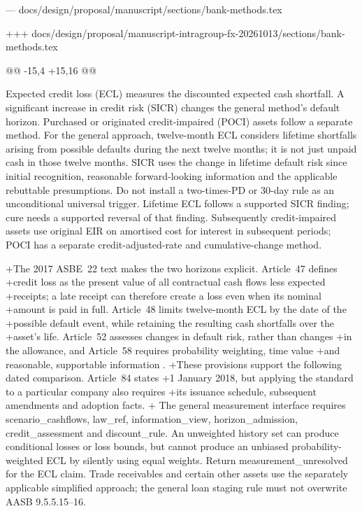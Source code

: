 --- docs/design/proposal/manuscript/sections/bank-methods.tex

+++ docs/design/proposal/manuscript-intragroup-fx-20261013/sections/bank-methods.tex

@@ -15,4 +15,16 @@

 Expected credit loss (ECL) measures the discounted expected cash shortfall. A significant increase in credit risk (SICR) changes the general method's default horizon. Purchased or originated credit-impaired (POCI) assets follow a separate method. For the general approach, twelve-month ECL considers lifetime shortfalls arising from possible defaults during the next twelve months; it is not just unpaid cash in those twelve months. SICR uses the change in lifetime default risk since initial recognition, reasonable forward-looking information and the applicable rebuttable presumptions. Do not install a two-times-PD or 30-day rule as an unconditional universal trigger. Lifetime ECL follows a supported SICR finding; cure needs a supported reversal of that finding. Subsequently credit-impaired assets use original EIR on amortised cost for interest in subsequent periods; POCI has a separate credit-adjusted-rate and cumulative-change method.
 
+The 2017 ASBE~22 text makes the two horizons explicit. Article~47 defines
+credit loss as the present value of all contractual cash flows less expected
+receipts; a late receipt can therefore create a loss even when its nominal
+amount is paid in full. Article~48 limits twelve-month ECL by the date of the
+possible default event, while retaining the resulting cash shortfalls over the
+asset's life. Article~52 assesses changes in default risk, rather than changes
+in the allowance, and Article~58 requires probability weighting, time value
+and reasonable, supportable information \citep[Articles 47--48, 52, 58]{mofasbe22}.
+These provisions support the following dated comparison. Article~84 states
+1 January 2018, but applying the standard to a particular company also requires
+its issuance schedule, subsequent amendments and adoption facts.
+
 The general measurement interface requires scenario\_cashflows, law\_ref, information\_view, horizon\_admission, credit\_assessment and discount\_rule. An unweighted history set can produce conditional losses or loss bounds, but cannot produce an unbiased probability-weighted ECL by silently using equal weights. Return measurement\_unresolved for the ECL claim. Trade receivables and certain other assets use the separately applicable simplified approach; the general loan staging rule must not overwrite AASB 9.5.5.15--16.
 
